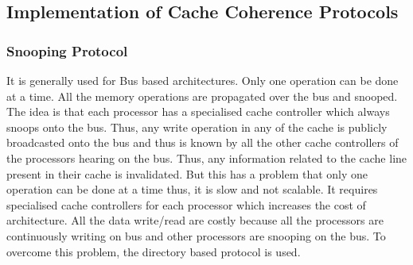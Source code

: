 \documentclass[12pt]{book}
\begin{document}
\subsection{Implementation of Cache Coherence Protocols}
\subsubsection{Snooping Protocol}
It is generally used for Bus based architectures. Only one operation 
can be done at a time. All the memory operations are propagated over the bus and snooped.
The idea is that each processor has a specialised cache controller which always snoops onto the bus.
Thus, any write operation in any of the cache is publicly broadcasted onto the bus and thus is known by all the other cache controllers 
of the processors hearing on the bus. Thus, any information related to the cache line present in their cache is invalidated.
But this has a problem that only one operation can be done at a time thus, it is slow and not scalable. It requires specialised cache 
controllers for each processor which increases the cost of architecture. All the data write/read are costly because all the processors are 
continuously writing on bus and other processors are snooping on the bus.
To overcome this problem, the directory based protocol is used.
\end{document}

